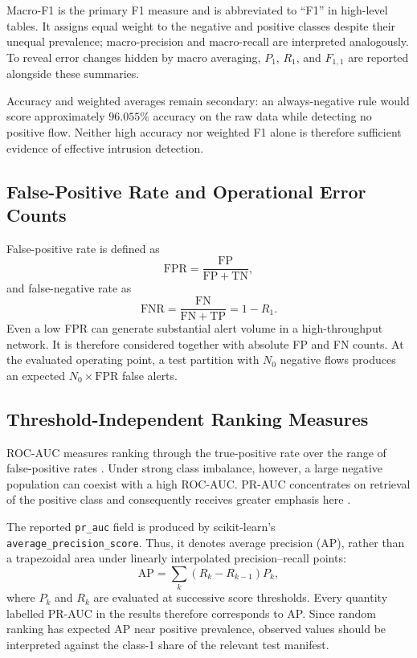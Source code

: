 \documentclass[11pt,fleqn]{report}
\begin{document}
Macro-F1 is the primary F1 measure and is abbreviated to ``F1'' in high-level tables. It assigns equal weight to the negative and positive classes despite their unequal prevalence; macro-precision and macro-recall are interpreted analogously. To reveal error changes hidden by macro averaging, $P_1$, $R_1$, and $F_{1,1}$ are reported alongside these summaries.

Accuracy and weighted averages remain secondary: an always-negative rule would score approximately $96.055\%$ accuracy on the raw data while detecting no positive flow. Neither high accuracy nor weighted F1 alone is therefore sufficient evidence of effective intrusion detection.

\subsection{False-Positive Rate and Operational Error Counts}
\label{subsubsec:fpr_metric}

False-positive rate is defined as
\begin{equation}
    \mathrm{FPR}=\frac{\mathrm{FP}}{\mathrm{FP}+\mathrm{TN}},
    \label{eq:false_positive_rate}
\end{equation}
and false-negative rate as
\begin{equation}
    \mathrm{FNR}=\frac{\mathrm{FN}}{\mathrm{FN}+\mathrm{TP}}
    =1-R_1.
    \label{eq:false_negative_rate}
\end{equation}
Even a low FPR can generate substantial alert volume in a high-throughput network. It is therefore considered together with absolute FP and FN counts. At the evaluated operating point, a test partition with $N_0$ negative flows produces an expected $N_0\times\mathrm{FPR}$ false alerts.

\subsection{Threshold-Independent Ranking Measures}
\label{subsubsec:ranking_metrics}

ROC-AUC measures ranking through the true-positive rate over the range of false-positive rates \cite{Fawcett2006ROC}. Under strong class imbalance, however, a large negative population can coexist with a high ROC-AUC. PR-AUC concentrates on retrieval of the positive class and consequently receives greater emphasis here \cite{SaitoRehmsmeier2015}.

The reported \texttt{pr\_auc} field is produced by scikit-learn's \texttt{average\_precision\_score}. Thus, it denotes average precision (AP), rather than a trapezoidal area under linearly interpolated precision--recall points:
\begin{equation}
    \mathrm{AP}=\sum_{k}(R_k-R_{k-1})P_k,
    \label{eq:average_precision}
\end{equation}
where $P_k$ and $R_k$ are evaluated at successive score thresholds. Every quantity labelled PR-AUC in the results therefore corresponds to AP. Since random ranking has expected AP near positive prevalence, observed values should be interpreted against the class-1 share of the relevant test manifest.
\end{document}
